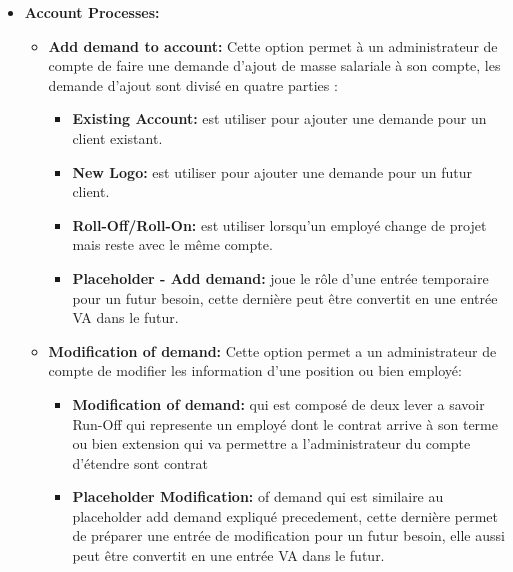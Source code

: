 \begin{itemize}
    \item[\ding{118}] \textbf{Account Processes:}
    
        \vspace{0.5cm}
        \begin{itemize}
            \item[\textbullet] \textbf{Add demand to account:} Cette option permet à un administrateur de compte de faire une demande d'ajout de masse salariale à son compte, les demande d'ajout sont divisé en quatre parties :
            
            \begin{itemize}
                \item[\ding{51}] \textbf{Existing Account:} est utiliser pour ajouter une demande pour un client existant.
                \item[\ding{51}] \textbf{New Logo:} est utiliser pour ajouter une demande pour un futur client.
                \item[\ding{51}] \textbf{Roll-Off/Roll-On:} est utiliser lorsqu’un employé change de projet mais reste avec le même  compte. 
                \item[\ding{51}] \textbf{Placeholder - Add demand:} joue le rôle d'une entrée temporaire pour un futur besoin, cette dernière peut être convertit en une entrée VA dans le futur.
            \end{itemize} 
            
            \newpage
            \item[\textbullet] \textbf{Modification of demand:} Cette option permet a un administrateur de compte de modifier les information d'une position ou bien employé: 
            
            \begin{itemize}
                \item[\ding{51}] \textbf{Modification of demand:} qui est composé de deux lever a savoir Run-Off qui represente un employé dont le contrat arrive à son terme ou bien extension qui va permettre a l'administrateur du compte d'étendre sont contrat
                \item[\ding{51}] \textbf{Placeholder Modification:} of demand qui est similaire au placeholder add demand expliqué precedement, cette dernière permet de préparer une entrée de modification pour un futur besoin, elle aussi peut être convertit en une entrée VA dans le futur.
            \end{itemize}
            

\end{itemize}
\end{itemize}
